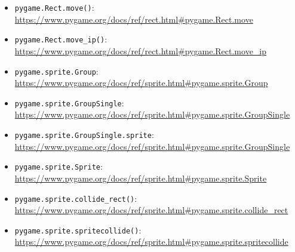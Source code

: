\begin{itemize}
	\item \texttt{pygame.Rect.move()}:
	\\
	\url{https://www.pygame.org/docs/ref/rect.html#pygame.Rect.move}

	\item \texttt{pygame.Rect.move\_ip()}:
	\\
	\url{https://www.pygame.org/docs/ref/rect.html#pygame.Rect.move_ip}

	\item \texttt{pygame.sprite.Group}:
	\\
	\url{https://www.pygame.org/docs/ref/sprite.html#pygame.sprite.Group}

	\item \texttt{pygame.sprite.GroupSingle}:
	\\
	\url{https://www.pygame.org/docs/ref/sprite.html#pygame.sprite.GroupSingle}

	\item \texttt{pygame.sprite.GroupSingle.sprite}:
	\\
\url{https://www.pygame.org/docs/ref/sprite.html#pygame.sprite.GroupSingle}

	\item \texttt{pygame.sprite.Sprite}:
	\\
	\url{https://www.pygame.org/docs/ref/sprite.html#pygame.sprite.Sprite}
	
	\item \texttt{pygame.sprite.collide\_rect()}:
	\\
	\url{https://www.pygame.org/docs/ref/sprite.html#pygame.sprite.collide_rect}
	
	\item \texttt{pygame.sprite.spritecollide()}:
    \\
    \url{https://www.pygame.org/docs/ref/sprite.html#pygame.sprite.spritecollide}
\end{itemize}



